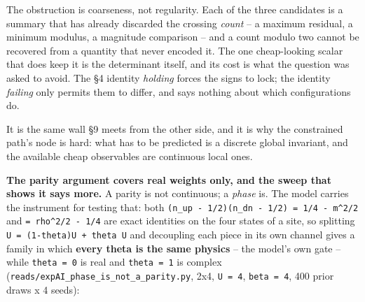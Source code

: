 \documentclass[10pt,letterpaper,twocolumn]{article}
\begin{document}
The obstruction is coarseness, not regularity. Each of the three candidates is a summary that has
already discarded the crossing \emph{count} -- a maximum residual, a minimum modulus, a magnitude
comparison -- and a count modulo two cannot be recovered from a quantity that never encoded it. The
one cheap-looking scalar that does keep it is the determinant itself, and its cost is what the
question was asked to avoid. The §4 identity \emph{holding} forces the signs to lock; the identity
\emph{failing} only permits them to differ, and says nothing about which configurations do.

It is the same wall §9 meets from the other side, and it is why the constrained path's node is
hard: what has to be predicted is a discrete global invariant, and the available cheap observables
are continuous local ones.

\textbf{The parity argument covers real weights only, and the sweep that shows it says more.} A parity
is not continuous; a \emph{phase} is. The model carries the instrument for testing that: both
\texttt{(\allowbreak{}n\_\allowbreak{}up\ -{}\allowbreak{}\ 1/\allowbreak{}2)\allowbreak{}(\allowbreak{}n\_\allowbreak{}dn\ -{}\allowbreak{}\ 1/\allowbreak{}2)\allowbreak{}\ =\allowbreak{}\ 1/\allowbreak{}4\ -{}\allowbreak{}\ m\^{}2/\allowbreak{}2} and \texttt{=\allowbreak{}\ rho\^{}2/\allowbreak{}2\ -{}\allowbreak{}\ 1/\allowbreak{}4} are exact identities on the four
states of a site, so splitting \texttt{U\ =\allowbreak{}\ (\allowbreak{}1-{}\allowbreak{}theta)\allowbreak{}U\ +\allowbreak{}\ theta\ U} and decoupling each piece in its own
channel gives a family in which \textbf{every theta is the same physics} -- the model's own gate --
while \texttt{theta\ =\allowbreak{}\ 0} is real and \texttt{theta\ =\allowbreak{}\ 1} is complex
(\texttt{reads/\allowbreak{}expAI\_\allowbreak{}phase\_\allowbreak{}is\_\allowbreak{}not\_\allowbreak{}a\_\allowbreak{}parity.\allowbreak{}py}, 2x4, \texttt{U\ =\allowbreak{}\ 4}, \texttt{beta\ =\allowbreak{}\ 4}, 400 prior draws x 4 seeds):
\end{document}
